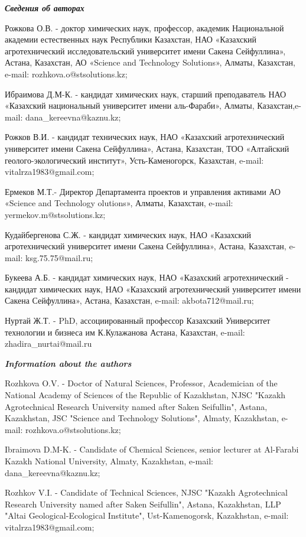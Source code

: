 \emph{{\bfseries Сведения об авторах}}

Рожкова О.В. - доктор химических наук, профессор, академик Национальной
академии естественных наук Республики Казахстан, НАО «Казахский
агротехнический исследовательский университет имени Сакена Сейфуллина»,
Астана, Казахстан, АО «Science and Technology Solutions», Алматы,
Казахстан, e-mail: rozhkova.o@stsolutions.kz;

Ибраимова Д.М-К. - кандидат химических наук, старший преподаватель НАО
«Казахский национальный университет имени аль-Фараби», Алматы,
Казахстан,e-mail: dana\_kereevna@kaznu.kz;

Рожков В.И. - кандидат технических наук, НАО «Казахский агротехнический
университет имени Сакена Сейфуллина», Астана, Казахстан, ТОО «Алтайский
геолого-экологический институт», Усть-Каменогорск, Казахстан, e-mail:
vitalrza1983@gmail.com;

Ермеков М.Т.- Директор Департамента проектов и управления активами АО
«Science and Technology olutions», Алматы, Казахстан, e-mail:
yermekov.m@stsolutions.kz;

Кудайбергенова С.Ж. - кандидат химических наук, НАО «Казахский
агротехнический университет имени Сакена Сейфуллина», Астана, Казахстан,
e-mail: ksg.75.75@mail.ru;

Букеева А.Б. - кандидат химических наук, НАО «Казахский агротехнический
- кандидат химических наук, НАО «Казахский агротехнический университет
имени Сакена Сейфуллина», Астана, Казахстан, e-mail: akbota712@mail.ru;

Нуртай Ж.Т. - PhD, ассоциированный профессор Казахский Университет
технологии и бизнеса им К.Кулажанова Астана, Казахстан, e-mail:
zhadira\_nurtai@mail.ru

\emph{{\bfseries Information about the authors}}

Rozhkova O.V. - Doctor of Natural Sciences, Professor, Academician of
the National Academy of Sciences of the Republic of Kazakhstan, NJSC
"Kazakh Agrotechnical Research University named after Saken Seifullin",
Astana, Kazakhstan, JSC "Science and Technology Solutions", Almaty,
Kazakhstan, e-mail: rozhkova.o@stsolutions.kz;

Ibraimova D.M-K. - Candidate of Chemical Sciences, senior lecturer at
Al-Farabi Kazakh National University, Almaty, Kazakhstan, e-mail:
dana\_kereevna@kaznu.kz;

Rozhkov V.I. - Candidate of Technical Sciences, NJSC "Kazakh
Agrotechnical Research University named after Saken Seifullin", Astana,
Kazakhstan, LLP "Altai Geological-Ecological Institute",
Ust-Kamenogorsk, Kazakhstan, e-mail: vitalrza1983@gmail.com;

